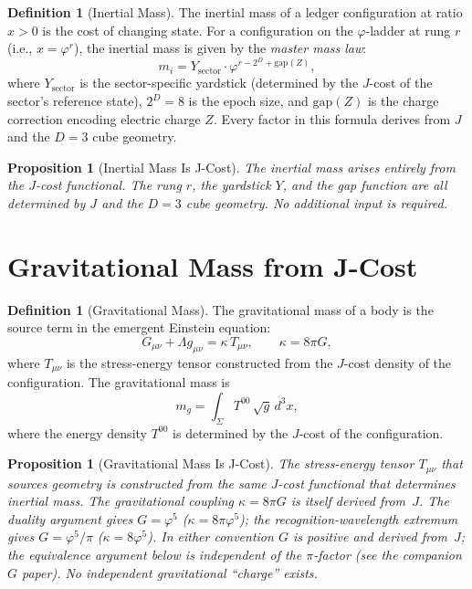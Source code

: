 \documentclass[12pt,a4paper]{article}
\newtheorem{proposition}[theorem]{Proposition}
\theoremstyle{definition}
\newtheorem{definition}[theorem]{Definition}
\theoremstyle{remark}
\begin{document}
\begin{definition}[Inertial Mass]
\label{def:mi}
The inertial mass of a ledger configuration at ratio $x > 0$
is the cost of changing state.  For a configuration on the
$\varphi$-ladder at rung $r$ (i.e., $x = \varphi^r$), the
inertial mass is given by the \emph{master mass law}:
\begin{equation}
  m_i = Y_{\mathrm{sector}} \cdot \varphi^{r - 2^D +
  \mathrm{gap}(Z)},
\end{equation}
where $Y_{\mathrm{sector}}$ is the sector-specific yardstick
(determined by the $J$-cost of the sector's reference state),
$2^D = 8$ is the epoch size, and $\mathrm{gap}(Z)$ is the
charge correction encoding electric charge $Z$.  Every factor
in this formula derives from $J$ and the $D = 3$ cube geometry.
\end{definition}

\begin{proposition}[Inertial Mass Is J-Cost]
\label{prop:mi-J}
The inertial mass arises entirely from the $J$-cost functional.
The rung $r$, the yardstick $Y$, and the gap function are all
determined by $J$ and the $D = 3$ cube geometry.  No additional
input is required.
\end{proposition}

\section{Gravitational Mass from J-Cost}
\label{sec:grav}

\begin{definition}[Gravitational Mass]
\label{def:mg}
The gravitational mass of a body is the source term in the
emergent Einstein equation:
\begin{equation}
  G_{\mu\nu} + \Lambda g_{\mu\nu} = \kappa\,T_{\mu\nu},
  \qquad \kappa = 8\pi G,
\end{equation}
where $T_{\mu\nu}$ is the stress-energy tensor constructed
from the $J$-cost density of the configuration.  The
gravitational mass is
\begin{equation}
  m_g = \int_\Sigma T^{00}\,\sqrt{g}\,d^3x,
\end{equation}
where the energy density $T^{00}$ is determined by the
$J$-cost of the configuration.
\end{definition}

\begin{proposition}[Gravitational Mass Is J-Cost]
\label{prop:mg-J}
The stress-energy tensor $T_{\mu\nu}$ that sources geometry
is constructed from the same $J$-cost functional that
determines inertial mass.  The gravitational coupling
$\kappa = 8\pi G$ is itself derived from~$J$.
The duality argument gives $G = \varphi^5$
($\kappa = 8\pi\varphi^5$); the recognition-wavelength
extremum gives $G = \varphi^5/\pi$
($\kappa = 8\varphi^5$).
In either convention $G$ is positive and derived from~$J$;
the equivalence argument below is independent of the
$\pi$-factor (see the companion $G$ paper).
No independent gravitational ``charge'' exists.
\end{proposition}
\end{document}

